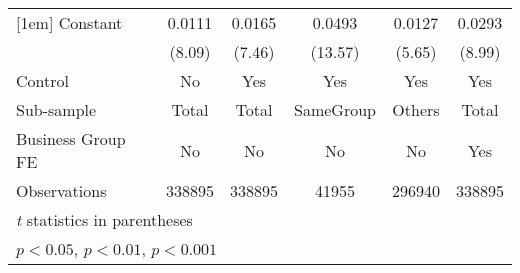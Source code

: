 {\begin{tabular}{l*{5}{c}}
[1em]
Constant            &      0.0111\sym{***}&      0.0165\sym{***}&      0.0493\sym{***}&      0.0127\sym{***}&      0.0293\sym{***}\\
                    &      (8.09)         &      (7.46)         &     (13.57)         &      (5.65)         &      (8.99)         \\
\hline
Control             &          No         &         Yes         &         Yes         &         Yes         &         Yes         \\
Sub-sample          &       Total         &       Total         &   SameGroup         &      Others         &       Total         \\
Business Group FE   &          No         &          No         &          No         &          No         &         Yes         \\
Observations        &      338895         &      338895         &       41955         &      296940         &      338895         \\
\hline\hline
\multicolumn{6}{l}{\footnotesize \textit{t} statistics in parentheses}\\
\multicolumn{6}{l}{\footnotesize \sym{*} \(p<0.05\), \sym{**} \(p<0.01\), \sym{***} \(p<0.001\)}\\
\end{tabular}
}
